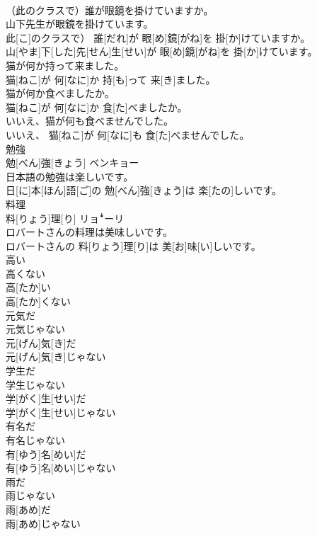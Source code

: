 \documentclass[8pt]{extreport}
\begin{document}
\begin{CJK}{UTF8}{min}
\\	（此のクラスで）誰が眼鏡を掛けていますか。 
\\	山下先生が眼鏡を掛けています。	
\\	此[こ]のクラスで） 誰[だれ]が 眼[め]鏡[がね]を 掛[か]けていますか。 
\\	山[やま]下[した]先[せん]生[せい]が 眼[め]鏡[がね]を 掛[か]けています。
\\	猫が何か持って来ました。	
\\	猫[ねこ]が 何[なに]か 持[も]って 来[き]ました。
\\	猫が何か食べましたか。	
\\	猫[ねこ]が 何[なに]か 食[た]べましたか。
\\	いいえ、猫が何も食べませんでした。	
\\	いいえ、 猫[ねこ]が 何[なに]も 食[た]べませんでした。
\\	勉強	
\\	勉[べん]強[きょう]	ベンキョー
\\	日本語の勉強は楽しいです。	
\\	日[に]本[ほん]語[ご]の 勉[べん]強[きょう]は 楽[たの]しいです。
\\	料理	
\\	料[りょう]理[り]	リョꜜーリ
\\	ロバートさんの料理は美味しいです。	
\\	ロバートさんの 料[りょう]理[り]は 美[お]味[い]しいです。
\\	高い 
\\	高くない	
\\	高[たか]い 
\\	高[たか]くない
\\	元気だ 
\\	元気じゃない	
\\	元[げん]気[き]だ 
\\	元[げん]気[き]じゃない
\\	学生だ 
\\	学生じゃない	
\\	学[がく]生[せい]だ 
\\	学[がく]生[せい]じゃない
\\	有名だ 
\\	有名じゃない	
\\	有[ゆう]名[めい]だ 
\\	有[ゆう]名[めい]じゃない
\\	雨だ 
\\	雨じゃない	
\\	雨[あめ]だ 
\\	雨[あめ]じゃない

\end{CJK}
\end{document}
